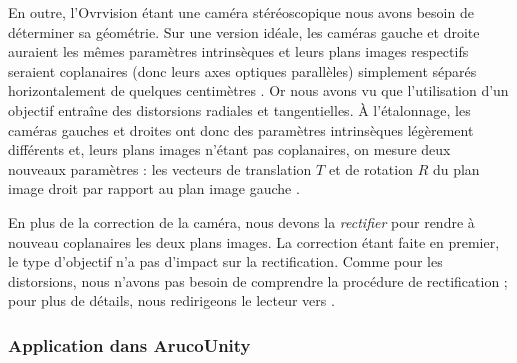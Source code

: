 En outre, l'Ovrvision étant une caméra stéréoscopique nous avons besoin de déterminer sa géométrie. Sur une version idéale, les caméras gauche et droite auraient les mêmes paramètres intrinsèques et leurs plans images respectifs seraient coplanaires (donc leurs axes optiques parallèles) simplement séparés horizontalement de quelques centimètres . Or nous avons vu que l'utilisation d'un objectif entraîne des distorsions radiales et tangentielles. À l'étalonnage, les caméras gauches et droites ont donc des paramètres intrinsèques légèrement différents et, leurs plans images n'étant pas coplanaires, on mesure deux nouveaux paramètres : les vecteurs de translation $T$ et de rotation $R$ du plan image droit par rapport au plan image gauche .

En plus de la correction de la caméra, nous devons la \emph{rectifier} pour rendre à nouveau coplanaires les deux plans images. La correction étant faite en premier, le type d'objectif n'a pas d'impact sur la rectification. Comme pour les distorsions, nous n'avons pas besoin de comprendre la procédure de rectification ; pour plus de détails, nous redirigeons le lecteur vers \cite[p. 419]{Bradski2008}.

\subsubsection{Application dans ArucoUnity}





